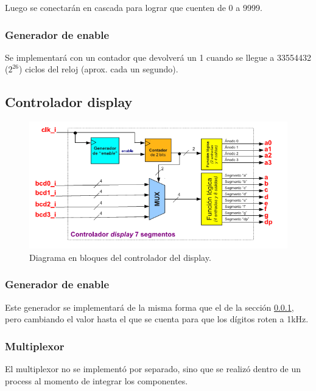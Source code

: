 \documentclass[a4paper,10pt]{article}
\begin{document}
Luego se conectarán en cascada para lograr que cuenten de 0 a 9999.

\subsubsection{Generador de enable}\label{gen}
Se implementará con un contador que devolverá un 1 cuando se llegue a 33554432 ($2^{26}$) ciclos del reloj (aprox. cada un segundo).

\subsection{Controlador display}
\begin{figure}[h]
	\centering
	\includegraphics{img/controladorDisplay.png}
	\caption{Diagrama en bloques del controlador del display.}
\end{figure}

\subsubsection{Generador de enable}
Este generador se implementará de la misma forma que el de la sección \ref{gen}, pero cambiando el valor hasta el que se cuenta para que los dígitos roten a 1kHz.

\subsubsection{Multiplexor}
El multiplexor no se implementó por separado, sino que se realizó dentro de un process al momento de integrar los componentes.
\end{document}
